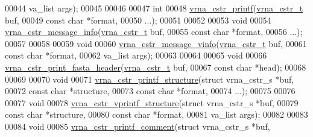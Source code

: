 \begin{DoxyCode}
00044                   va\_list     args);
00045 
00046 
00047 \textcolor{keywordtype}{int}
00048 \mbox{\hyperlink{group__buffer__utils_ga3c7eaa46b1e74c4641e4fa5927079462}{vrna\_cstr\_printf}}(\mbox{\hyperlink{group__buffer__utils_ga445bbbcfca238a956bbc11862892adc8}{vrna\_cstr\_t}}  buf,
00049                  \textcolor{keyword}{const} \textcolor{keywordtype}{char}   *format,
00050                  ...);
00051 
00052 
00053 \textcolor{keywordtype}{void}
00054 \mbox{\hyperlink{group__buffer__utils_gaa0da077cf03f29808229ab8c0e1e63eb}{vrna\_cstr\_message\_info}}(\mbox{\hyperlink{group__buffer__utils_ga445bbbcfca238a956bbc11862892adc8}{vrna\_cstr\_t}}  buf,
00055                        \textcolor{keyword}{const} \textcolor{keywordtype}{char}   *format,
00056                        ...);
00057 
00058 
00059 \textcolor{keywordtype}{void}
00060 \mbox{\hyperlink{group__buffer__utils_ga791a25424f0bc9769ec16a22794c7137}{vrna\_cstr\_message\_vinfo}}(\mbox{\hyperlink{group__buffer__utils_ga445bbbcfca238a956bbc11862892adc8}{vrna\_cstr\_t}} buf,
00061                         \textcolor{keyword}{const} \textcolor{keywordtype}{char}  *format,
00062                         va\_list     args);
00063 
00064 
00065 \textcolor{keywordtype}{void}
00066 \mbox{\hyperlink{group__buffer__utils_ga0a320b027c942dc85c508788272dd861}{vrna\_cstr\_print\_fasta\_header}}(\mbox{\hyperlink{group__buffer__utils_ga445bbbcfca238a956bbc11862892adc8}{vrna\_cstr\_t}}  buf,
00067                              \textcolor{keyword}{const} \textcolor{keywordtype}{char}   *head);
00068 
00069 
00070 \textcolor{keywordtype}{void}
00071 \mbox{\hyperlink{group__buffer__utils_ga29af50810807da04d6a244f8801728f9}{vrna\_cstr\_printf\_structure}}(\textcolor{keyword}{struct} vrna\_cstr\_s *buf,
00072                            \textcolor{keyword}{const} \textcolor{keywordtype}{char}         *structure,
00073                            \textcolor{keyword}{const} \textcolor{keywordtype}{char}         *format,
00074                            ...);
00075 
00076 
00077 \textcolor{keywordtype}{void}
00078 \mbox{\hyperlink{group__buffer__utils_gad4cd97b8943fdb83652cb6b46d91bb44}{vrna\_cstr\_vprintf\_structure}}(\textcolor{keyword}{struct} vrna\_cstr\_s  *buf,
00079                             \textcolor{keyword}{const} \textcolor{keywordtype}{char}          *structure,
00080                             \textcolor{keyword}{const} \textcolor{keywordtype}{char}          *format,
00081                             va\_list             args);
00082 
00083 
00084 \textcolor{keywordtype}{void}
00085 \mbox{\hyperlink{group__buffer__utils_ga31409fdd5c038ee488bdf1ffcc630253}{vrna\_cstr\_printf\_comment}}(\textcolor{keyword}{struct} vrna\_cstr\_s *buf,

\end{DoxyCode}
